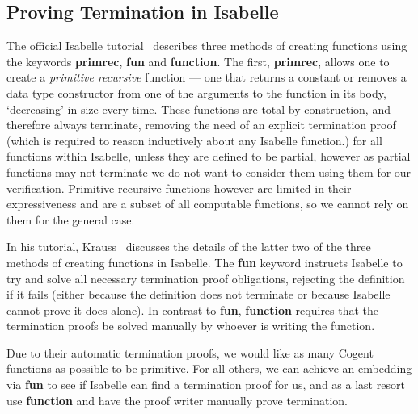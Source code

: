 \subsection{Proving Termination in Isabelle}


The official Isabelle tutorial~\citep{IsabelleTutorial} describes three methods of creating functions using
the keywords \textbf{primrec}, \textbf{fun} and \textbf{function}. The first, \textbf{primrec},
allows one to create a \textit{primitive recursive} function --- one that returns a constant or removes
a data type constructor from one of the arguments to the function in its body, `decreasing' in size every time.
These functions are total by construction, and therefore always terminate, removing the need of
an explicit termination proof (which is required to reason inductively about any Isabelle function.)
for all functions within Isabelle, unless they are defined to be partial, however as partial functions
may not terminate we do not want to consider them using them for our verification.
Primitive recursive functions however are limited in their expressiveness and are a subset of all computable
functions, so we cannot rely on them for the general case.

In his tutorial, Krauss~\citep{KraussIsabelle} discusses the details of the latter two of the three methods
of creating functions in Isabelle. The \textbf{fun} keyword instructs Isabelle to try and solve all necessary
termination proof obligations, rejecting the definition if it fails (either because the definition does not 
terminate or because Isabelle cannot prove it does alone). In contrast to \textbf{fun}, \textbf{function}
requires that the termination proofs be solved manually by whoever is writing the function.


Due to their automatic termination proofs, we would like as many Cogent functions as possible to be
primitive. For all others, we can achieve an embedding via \textbf{fun} to see if Isabelle can find
a termination proof for us, and as a last resort use \textbf{function} and have the proof writer
manually prove termination. 

